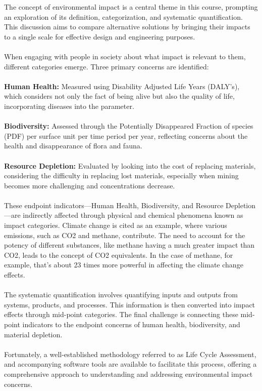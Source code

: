\documentclass[../summary.tex]{subfiles}
\begin{document}
The concept of environmental impact is a central theme in this course, prompting an exploration of its definition, categorization, and systematic quantification. This discussion aims to compare alternative solutions by bringing their impacts to a single scale for effective design and engineering purposes.\\
\\
When engaging with people in society about what impact is relevant to them, different categories emerge. Three primary concerns are identified:\\
\\
\textbf{Human Health:} Measured using Disability Adjusted Life Years (DALY’s), which considers not only the fact of being alive but also the quality of life, incorporating diseases into the parameter.\\
\\
\textbf{Biodiversity:} Assessed through the Potentially Disappeared Fraction of species (PDF) per surface unit per time period per year, reflecting concerns about the health and disappearance of flora and fauna.\\
\\
\textbf{Resource Depletion:} Evaluated by looking into the cost of replacing materials, considering the difficulty in replacing lost materials, especially when mining becomes more challenging and concentrations decrease.\\
\\
These endpoint indicators—Human Health, Biodiversity, and Resource Depletion—are indirectly affected through physical and chemical phenomena known as impact categories. Climate change is cited as an example, where various emissions, such as CO2 and methane, contribute. The need to account for the potency of different substances, like methane having a much greater impact than CO2, leads to the concept of CO2 equivalents. In the case of methane, for example, that's about 23 times more powerful in affecting the climate change effects.\\
\\
The systematic quantification involves quantifying inputs and outputs from systems, products, and processes. This information is then converted into impact effects through mid-point categories. The final challenge is connecting these mid-point indicators to the endpoint concerns of human health, biodiversity, and material depletion.\\
\\
Fortunately, a well-established methodology referred to as Life Cycle Assessment, and accompanying software tools are available to facilitate this process, offering a comprehensive approach to understanding and addressing environmental impact concerns.
\end{document}
